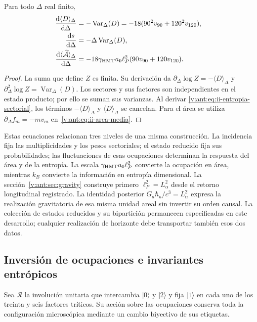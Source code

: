 \begin{proposition}
Para todo $\Delta$ real finito,
\begin{align}
 \frac{\mathrm d\langle D\rangle_\Delta}{\mathrm d\Delta}
 &=-\operatorname{Var}_\Delta(D)
   =-18(90^2v_{90}+120^2v_{120}),\\
 \frac{\mathrm d s}{\mathrm d\Delta}
 &=-\Delta\operatorname{Var}_\Delta(D),
 \label{v:ant:eq:ii-respuesta-entropica}\\
 \frac{\mathrm d\langle\widehat{\mathcal A}\rangle_\Delta}{\mathrm d\Delta}
 &=-18\gamma_{\mathrm{HMT}}a_0\ell_P^2(90v_{90}+120v_{120}).
 \label{v:ant:eq:ii-respuesta-areal}
\end{align}
\end{proposition}
\begin{proof}
La suma que define $Z$ es finita. Su derivación da
$\partial_\Delta\log Z=-\langle D\rangle_\Delta$ y
$\partial_\Delta^2\log Z=\operatorname{Var}_\Delta(D)$.
Los sectores y sus factores son independientes en el estado producto;
por ello se suman sus varianzas. Al derivar
\eqref{v:ant:eq:ii-entropia-sectorial}, los términos
$-\langle D\rangle_\Delta$ y $\langle D\rangle_\Delta$
se cancelan. Para el área se utiliza
$\partial_\Delta f_m=-mv_m$ en~\eqref{v:ant:eq:ii-area-media}.
\end{proof}

Estas ecuaciones relacionan tres niveles de una misma construcción.
La incidencia fija las multiplicidades y los pesos sectoriales; el
estado reducido fija sus probabilidades; las fluctuaciones de esas
ocupaciones determinan la respuesta del área y de la entropía.
La escala $\gamma_{\mathrm{HMT}}a_0\ell_P^2$ convierte la ocupación en área,
mientras $k_B$ convierte la información en entropía dimensional.
La sección~\ref{v:ant:sec:gravity} construye primero
$\ell_P^2=L_\alpha^2$ desde el retorno longitudinal registrado. La
identidad posterior $G_a\hbar_a/c^3=L_\alpha^2$ expresa la realización
gravitatoria de esa misma unidad areal sin invertir su orden causal.
La colección de estados reducidos y su bipartición permanecen especificadas
en este desarrollo; cualquier realización de horizonte debe transportar
también esos dos datos.

\subsection{Inversión de ocupaciones e invariantes entrópicos}
\label{v:ant:sec:ii-inversion-sectorial}

Sea $\mathcal R$ la involución unitaria que intercambia $|0\rangle$
y $|2\rangle$ y fija $|1\rangle$ en cada uno de los treinta y seis
factores tríticos. Su acción sobre las ocupaciones conserva toda la
configuración microscópica mediante un cambio biyectivo de sus etiquetas.

